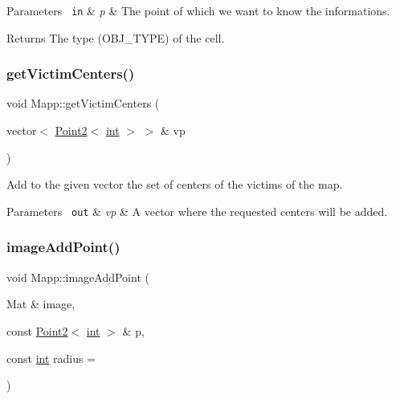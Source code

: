 \begin{DoxyParams}[1]{Parameters}
\mbox{\texttt{ in}}  & {\em p} & The point of which we want to know the informations. \\
\hline
\end{DoxyParams}
\begin{DoxyReturn}{Returns}
The type (O\+B\+J\+\_\+\+T\+Y\+PE) of the cell. 
\end{DoxyReturn}
\mbox{\label{class_mapp_a3b3ad207536bfb80c9ea2fd254bfdd80}} 
\subsubsection{\texorpdfstring{getVictimCenters()}{getVictimCenters()}}
{\footnotesize\ttfamily void Mapp\+::get\+Victim\+Centers (\begin{DoxyParamCaption}\item[{vector$<$ \mbox{\hyperlink{class_point2}{Point2}}$<$ \mbox{\hyperlink{draw_8hh_aa620a13339ac3a1177c86edc549fda9b}{int}} $>$ $>$ \&}]{vp }\end{DoxyParamCaption})}



Add to the given vector the set of centers of the victims of the map. 


\begin{DoxyParams}[1]{Parameters}
\mbox{\texttt{ out}}  & {\em vp} & A vector where the requested centers will be added. \\
\hline
\end{DoxyParams}
\mbox{\label{class_mapp_a198e313f3473420c99e6206645f94693}} 
\subsubsection{\texorpdfstring{imageAddPoint()}{imageAddPoint()}}
{\footnotesize\ttfamily void Mapp\+::image\+Add\+Point (\begin{DoxyParamCaption}\item[{Mat \&}]{image,  }\item[{const \mbox{\hyperlink{class_point2}{Point2}}$<$ \mbox{\hyperlink{draw_8hh_aa620a13339ac3a1177c86edc549fda9b}{int}} $>$ \&}]{p,  }\item[{const \mbox{\hyperlink{draw_8hh_aa620a13339ac3a1177c86edc549fda9b}{int}}}]{radius = {} }\end{DoxyParamCaption})}



